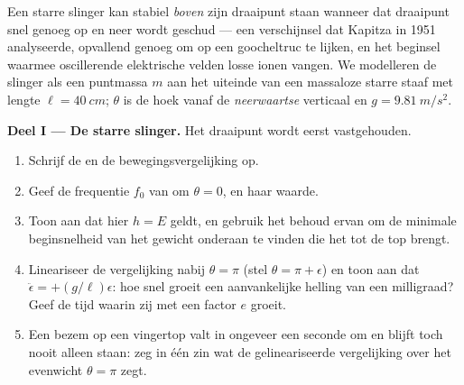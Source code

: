\begin{problem}\label{pb:b3:lagrangian-mechanics:1}
Een starre slinger kan stabiel \emph{boven} zijn draaipunt staan wanneer
dat draaipunt snel genoeg op en neer wordt geschud --- een verschijnsel
dat Kapitza in 1951 analyseerde, opvallend genoeg om op een goocheltruc te
lijken, en het beginsel waarmee oscillerende elektrische velden losse
ionen vangen. We modelleren de slinger als een puntmassa $m$ aan het
uiteinde van een massaloze starre staaf met lengte $\ell = \qty{40}{cm}$;
$\theta$ is de hoek vanaf de \emph{neerwaartse} verticaal en $g = \qty{9.81}{m/s^2}$.

\medskip\noindent\textbf{Deel I --- De starre slinger.}
Het draaipunt wordt eerst vastgehouden.
\begin{enumerate}
  \item Schrijf de  en de bewegingsvergelijking op.
  \item Geef de frequentie $f_0$ van  om $\theta =
        0$,
        en haar waarde.
  \item Toon aan dat hier $h = E$ geldt, en gebruik het behoud ervan om
        de minimale beginsnelheid van het gewicht onderaan te vinden die
        het tot de top brengt.
  \item Lineariseer de vergelijking nabij $\theta = \pi$ (stel $\theta = \pi +
        \epsilon$) en toon aan dat $\ddot\epsilon = +(g/\ell)\epsilon$: hoe snel groeit een aanvankelijke helling van
        een milligraad? Geef de tijd waarin zij met een factor $e$ groeit.
  \item Een bezem op een vingertop valt in ongeveer een seconde om en
        blijft toch nooit alleen staan: zeg in één zin wat de
        gelineariseerde vergelijking over het evenwicht $\theta = \pi$
        zegt.
\end{enumerate}


\end{problem}
